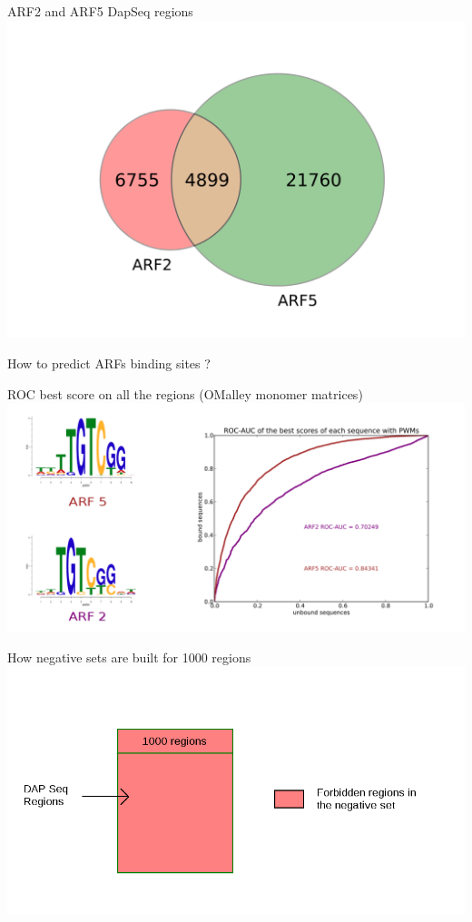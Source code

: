 \documentclass{beamer}
\begin{document}
\begin{frame}{ARF2 and ARF5 DapSeq regions}
  \includegraphics[width=1\textwidth,height=0.8\textheight,center]{Venn.png}
\end{frame}

\begin{frame}
\centering
\Huge{How to predict ARFs binding sites ?}
\end{frame}


\begin{frame}{ROC best score on all the regions (OMalley monomer matrices)}
  \includegraphics[width=1\textwidth,height=0.8\textheight,center]{ROC_et_logo.png}
\end{frame}


\begin{frame}{How negative sets are built for 1000 regions}
  \includegraphics[width=1\textwidth,height=0.8\textheight,center]{negative_set_all_regions.png}
\end{frame}
\end{document}
